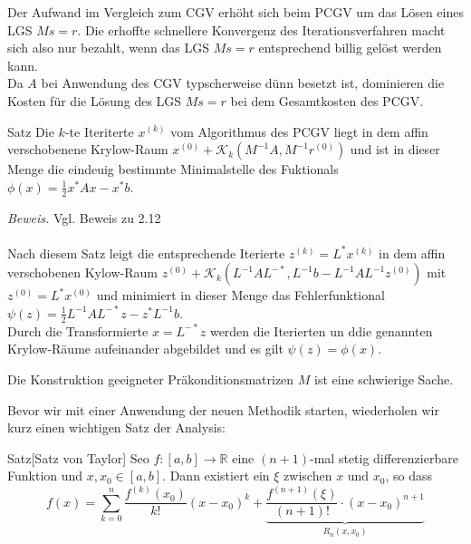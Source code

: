 \documentclass{article}
\begin{document}
    Der Aufwand im Vergleich zum CGV erhöht sich beim PCGV um das Lösen eines LGS $Ms=r$. Die erhoffte schnellere
    Konvergenz des Iterationsverfahren macht sich also nur bezahlt, wenn das LGS $Ms=r$ entsprechend billig gelöst
    werden kann. \\
    Da $A$ bei Anwendung des CGV typscherweise dünn besetzt ist, dominieren die Kosten für die Lösung des LGS $Ms=r$ 
    bei dem Gesamtkosten des PCGV.
    \begin{thmbox}{Satz}
        Die $k$-te Iteriterte $x^{(k)}$ vom Algorithmus des PCGV liegt in dem affin verschobenene Krylow-Raum
        $x^{(0)} + \mathcal{K}_k(M^{-1}A, M^{-1}r^{(0)})$ und ist in dieser Menge die eindeuig bestimmte Minimalstelle
        des Fuktionals $\phi(x) = \tfrac{1}{2}x^*Ax-x^*b$.
    \end{thmbox}
    \textit{Beweis.} Vgl. Beweis zu 2.12 \\ \\
    Nach diesem Satz leigt die entsprechende Iterierte $z^{(k)}=L^*x^{(k)}$ in dem affin verschobenen Kylow-Raum
    $z^{(0)} + \mathcal{K}_k(L^{-1}AL^{-*}, L^{-1}b-L^{-1}AL^{-1}z^{(0)})$ mit $z^{(0)} = L^*x^{(0)}$ 
    und minimiert in dieser Menge das Fehlerfunktional $\psi(z) = \tfrac{1}{2}L^{-1}AL^{-*}z-z^*L^{-1}b$.  \\
    Durch die Transformierte $x=L^{-*}z$ werden die Iterierten un ddie genannten Krylow-Räume aufeinander abgebildet
    und es gilt $\psi(z) = \phi(x)$.
    \begin{rembox}
        Die Konstruktion geeigneter Präkonditionsmatrizen $M$ ist eine schwierige Sache.
    \end{rembox}
    Bevor wir mit einer Anwendung der neuen Methodik starten, wiederholen wir kurz einen wichtigen Satz der Analysis:
    \begin{thmbox}{Satz}[Satz von Taylor]
        Seo $f:[a,b]\rightarrow \mathbb{R}$ eine $(n+1)$-mal stetig differenzierbare Funktion und $x,x_0\in[a,b]$. 
        Dann existiert ein $\xi$ zwischen $x$ und $x_0$, so dass
        \[f(x) = \sum_{k=0}^{n}\dfrac{f^{(k)}(x_0)}{k!}(x-x_0)^k + 
        \underbrace{\dfrac{f^{(n+1)}(\xi)}{(n+1)!}\cdot(x-x_0)^{n+1}}_{R_n(x,x_0)}\]
    \end{thmbox}
\end{document}
